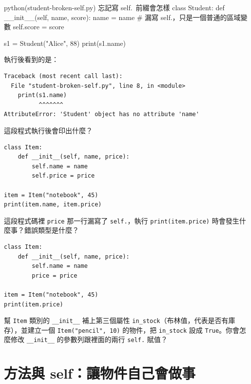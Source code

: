 \begin{example}{python}{(student-broken-self.py) 忘記寫 self.\ 前綴會怎樣}
class Student:
    def __init__(self, name, score):
        name = name          # 漏寫 self.，只是一個普通的區域變數
        self.score = score


s1 = Student("Alice", 88)
print(s1.name)
\end{example}

執行後看到的是：

\begin{verbatim}
Traceback (most recent call last):
  File "student-broken-self.py", line 8, in <module>
    print(s1.name)
          ^^^^^^^
AttributeError: 'Student' object has no attribute 'name'
\end{verbatim}


\begin{drills}[label=drills:class-init]
\item 這段程式執行後會印出什麼？
\begin{verbatim}
class Item:
    def __init__(self, name, price):
        self.name = name
        self.price = price

item = Item("notebook", 45)
print(item.name, item.price)
\end{verbatim}
\item 這段程式碼裡 \texttt{price} 那一行漏寫了 \texttt{self.}，執行
\texttt{print(item.price)} 時會發生什麼事？錯誤類型是什麼？
\begin{verbatim}
class Item:
    def __init__(self, name, price):
        self.name = name
        price = price

item = Item("notebook", 45)
print(item.price)
\end{verbatim}
\item 幫 \texttt{Item} 類別的 \texttt{\_\_init\_\_} 補上第三個屬性
\texttt{in\_stock}（布林值，代表是否有庫存），並建立一個 \texttt{Item("pencil", 10)}
的物件，把 \texttt{in\_stock} 設成 \texttt{True}。你會怎麼修改
\texttt{\_\_init\_\_} 的參數列跟裡面的兩行 \texttt{self.} 賦值？
\end{drills}

\section{方法與 self：讓物件自己會做事}
\label{sec:methods-and-self}


